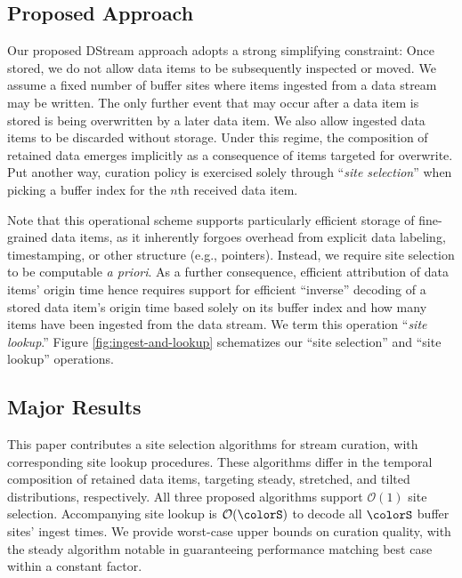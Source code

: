 \subsection{Proposed Approach}


Our proposed DStream approach adopts a strong simplifying constraint: Once stored, we do not allow data items to be subsequently inspected or moved.
We assume a fixed number of buffer sites where items ingested from a data stream may be written.
The only further event that may occur after a data item is stored is being overwritten by a later data item.
We also allow ingested data items to be discarded without storage.
Under this regime, the composition of retained data emerges implicitly as a consequence of items targeted for overwrite.
Put another way, curation policy is exercised solely through ``\textit{site selection}'' when picking a buffer index for the $n$th received data item.

Note that this operational scheme supports particularly efficient storage of fine-grained data items, as it inherently forgoes overhead from explicit data labeling, timestamping, or other structure (e.g., pointers).
Instead, we require site selection to be computable \textit{a priori}.
As a further consequence, efficient attribution of data items' origin time hence requires support for efficient ``inverse'' decoding of a stored data item's origin time based solely on its buffer index and how many items have been ingested from the data stream.
We term this operation ``\textit{site lookup}.''
Figure \ref{fig:ingest-and-lookup} schematizes our ``site selection'' and ``site lookup'' operations.



\subsection{Major Results}

This paper contributes a site selection algorithms for stream curation, with corresponding site lookup procedures.
These algorithms differ in the temporal composition of retained data items, targeting steady, stretched, and tilted distributions, respectively.
All three proposed algorithms support $\mathcal{O}(1)$ site selection.
Accompanying site lookup is $\mathcal{O}(\colorS)$ to decode all $\colorS$ buffer sites' ingest times.
We provide worst-case upper bounds on curation quality, with the steady algorithm notable in guaranteeing performance matching best case within a constant factor.
